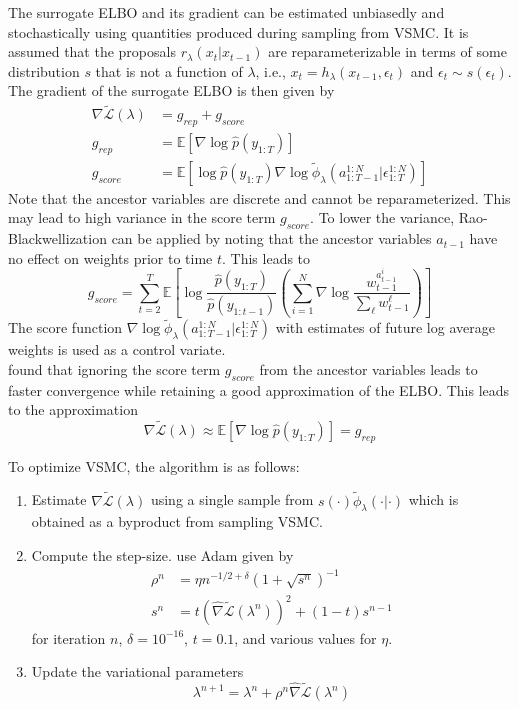 \documentclass[12pt]{article}
\begin{document}
The surrogate ELBO and its gradient can be estimated unbiasedly and stochastically using quantities produced during sampling from VSMC. It is assumed that the proposals $r_\lambda(x_t|x_{t-1})$ are reparameterizable in terms of some distribution $s$ that is not a function of $\lambda$, i.e., $x_t=h_\lambda(x_{t-1},\epsilon_t)$ and $\epsilon_t\sim s(\epsilon_t)$. The gradient of the surrogate ELBO is then given by
\begin{align*}
\nabla \tilde{\mathcal{L}}(\lambda) &= g_{rep} + g_{score} \\
g_{rep} &= \mathbb{E}[\nabla\log\hat{p}(y_{1:T})] \\
g_{score} &= \mathbb{E}\left[\log\hat{p}(y_{1:T})\nabla\log\tilde{\phi}_\lambda(a_{1:T-1}^{1:N}|\epsilon_{1:T}^{1:N})\right]
\end{align*}
Note that the ancestor variables are discrete and cannot be reparameterized. This may lead to high variance in the score term $g_{score}$. To lower the variance, Rao-Blackwellization \parencite{Robert:2021} can be applied by noting that the ancestor variables $a_{t-1}$ have no effect on weights prior to time $t$. This leads to
\[
g_{score} = \sum_{t=2}^T\mathbb{E}\left[\log \frac{\hat{p}(y_{1:T})}{\hat{p}(y_{1:t-1})}\left(\sum_{i=1}^N\nabla\log \frac{w_{t-1}^{a_{t-1}^i}}{\sum_\ell w_{t-1}^\ell}\right)\right]
\]
The score function $\nabla\log\tilde{\phi}_\lambda(a_{1:T-1}^{1:N}|\epsilon_{1:T}^{1:N})$ with estimates of future log average weights is used as a control variate.
\\

\textcite{Naesseth:2018} found that ignoring the score term $g_{score}$ from the ancestor variables leads to faster convergence while retaining a good approximation of the ELBO. This leads to the approximation
\[
\nabla\tilde{\mathcal{L}}(\lambda) \approx \mathbb{E}[\nabla\log\hat{p}(y_{1:T})] = g_{rep}
\]

To optimize VSMC, the algorithm is as follows:
\begin{enumerate}

\item
Estimate $\nabla\tilde{\mathcal{L}}(\lambda)$ using a single sample from $s(\cdot)\tilde{\phi}_\lambda(\cdot|\cdot)$ which is obtained as a byproduct from sampling VSMC.

\item
Compute the step-size. \textcite{Naesseth:2018} use Adam given by
\begin{align*}
\rho^n &= \eta n^{-1/2+\delta}(1+\sqrt{s^n})^{-1} \\
s^n &= t\left(\hat{\nabla}\tilde{\mathcal{L}}(\lambda^n)\right)^2+(1-t)s^{n-1}
\end{align*}
for iteration $n$, $\delta=10^{-16}$, $t=0.1$, and various values for $\eta$.

\item
Update the variational parameters
\[
\lambda^{n+1} = \lambda^n+\rho^n\hat{\nabla}\tilde{\mathcal{L}}(\lambda^n)
\]

\end{enumerate}
\end{document}
